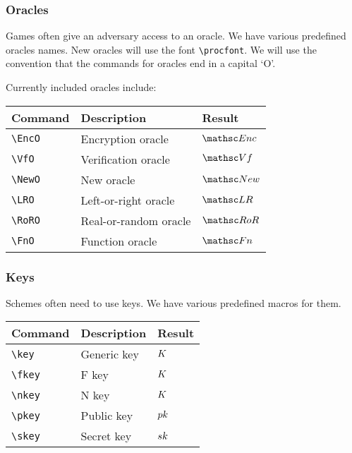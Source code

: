 \documentclass[11pt,twoside]{report}
\begin{document}
\subsubsection{Oracles}
Games often give an adversary access to an oracle.
We have various predefined oracles names.
New oracles will use the font \lstinline$\procfont$.
We will use the convention that the commands for oracles end in a capital `O'.

Currently included oracles include:
\begin{center}
\begin{tabular}{l l l}
	\textbf{Command} & \textbf{Description} & \textbf{Result} \\\hline
	\lstinline$\EncO$ & Encryption oracle & $\EncO$  \\
	\lstinline$\VfO$ & Verification oracle & $\VfO$  \\
	\lstinline$\NewO$ & New oracle & $\NewO$  \\
	\lstinline$\LRO$ & Left-or-right oracle & $\LRO$  \\
	\lstinline$\RoRO$ & Real-or-random oracle & $\RoRO$  \\
	\lstinline$\FnO$ & Function oracle & $\FnO$
\end{tabular}
\end{center}

\subsubsection{Keys}
Schemes often need to use keys.
We have various predefined macros for them.

\begin{center}
\begin{tabular}{l l l}
	\textbf{Command} & \textbf{Description} & \textbf{Result} \\\hline
	\lstinline$\key$ & Generic key & $K$  \\
	\lstinline$\fkey$ & F key & $K$  \\
	\lstinline$\nkey$ & N key & $K$  \\
	\lstinline$\pkey$ & Public key & $pk$  \\
	\lstinline$\skey$ & Secret key & $sk$
\end{tabular}
\end{center}






\end{document}
